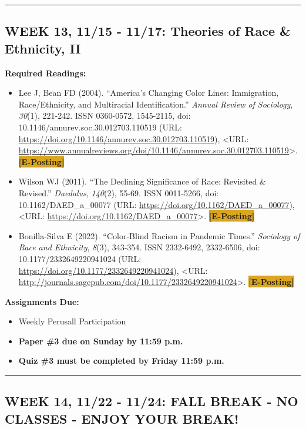 \documentclass[11pt,]{article}
\providecommand{\tightlist}{%
  \setlength{\itemsep}{0pt}\setlength{\parskip}{0pt}}
\begin{document}
\bigbreak
\hrule

\hypertarget{week-13-1115---1117-theories-of-race-ethnicity-ii}{%
\subsection{WEEK 13, 11/15 - 11/17: Theories of Race \& Ethnicity,
II}\label{week-13-1115---1117-theories-of-race-ethnicity-ii}}

\textbf{Required Readings:}

\begin{itemize}
\item
  Lee J, Bean FD (2004). ``America's Changing Color Lines: Immigration,
  Race/Ethnicity, and Multiracial Identification.'' \emph{Annual Review
  of Sociology}, \emph{30}(1), 221-242. ISSN 0360-0572, 1545-2115, doi:
  10.1146/annurev.soc.30.012703.110519 (URL:
  \url{https://doi.org/10.1146/annurev.soc.30.012703.110519}),
  \textless URL:
  \url{https://www.annualreviews.org/doi/10.1146/annurev.soc.30.012703.110519}\textgreater.
  \colorbox{Goldenrod}{\bf{[E-Posting]}}
\item
  Wilson WJ (2011). ``The Declining Significance of Race: Revisited \&
  Revised.'' \emph{Daedalus}, \emph{140}(2), 55-69. ISSN 0011-5266, doi:
  10.1162/DAED\_a\_00077 (URL:
  \url{https://doi.org/10.1162/DAED_a_00077}), \textless URL:
  \url{https://doi.org/10.1162/DAED_a_00077}\textgreater.
  \colorbox{Goldenrod}{\bf{[E-Posting]}}
\item
  Bonilla-Silva E (2022). ``Color-Blind Racism in Pandemic Times.''
  \emph{Sociology of Race and Ethnicity}, \emph{8}(3), 343-354. ISSN
  2332-6492, 2332-6506, doi: 10.1177/2332649220941024 (URL:
  \url{https://doi.org/10.1177/2332649220941024}), \textless URL:
  \url{http://journals.sagepub.com/doi/10.1177/2332649220941024}\textgreater.
  \colorbox{Goldenrod}{\bf{[E-Posting]}}
\end{itemize}

\textbf{Assignments Due:}

\begin{itemize}
\tightlist
\item
  Weekly Perusall Participation
\item
  \textbf{Paper \#3 due on Sunday by 11:59 p.m.}
\item
  \textbf{Quiz \#3 must be completed by Friday 11:59 p.m.}
\end{itemize}

\bigbreak
\hrule

\hypertarget{week-14-1122---1124-fall-break---no-classes---enjoy-your-break}{%
\subsection{WEEK 14, 11/22 - 11/24: FALL BREAK - NO CLASSES - ENJOY YOUR
BREAK!}\label{week-14-1122---1124-fall-break---no-classes---enjoy-your-break}}
\end{document}
